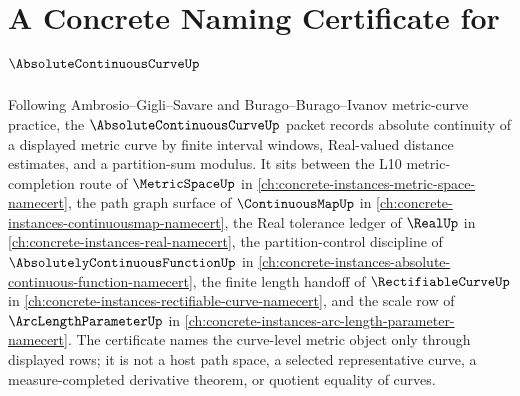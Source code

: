 \chapter{A Concrete Naming Certificate for $\AbsoluteContinuousCurveUp$}
\label{ch:concrete-instances-absolute-continuous-curve-namecert}

Following Ambrosio--Gigli--Savare and Burago--Burago--Ivanov metric-curve practice, the $\AbsoluteContinuousCurveUp$ packet records absolute continuity of a displayed metric curve by finite interval windows, Real-valued distance estimates, and a partition-sum modulus. It sits between the L10 metric-completion route of $\MetricSpaceUp$ in \autoref{ch:concrete-instances-metric-space-namecert}, the path graph surface of $\ContinuousMapUp$ in \autoref{ch:concrete-instances-continuousmap-namecert}, the Real tolerance ledger of $\RealUp$ in \autoref{ch:concrete-instances-real-namecert}, the partition-control discipline of $\AbsolutelyContinuousFunctionUp$ in \autoref{ch:concrete-instances-absolute-continuous-function-namecert}, the finite length handoff of $\RectifiableCurveUp$ in \autoref{ch:concrete-instances-rectifiable-curve-namecert}, and the scale row of $\ArcLengthParameterUp$ in \autoref{ch:concrete-instances-arc-length-parameter-namecert}. The certificate names the curve-level metric object only through displayed rows; it is not a host path space, a selected representative curve, a measure-completed derivative theorem, or quotient equality of curves.


